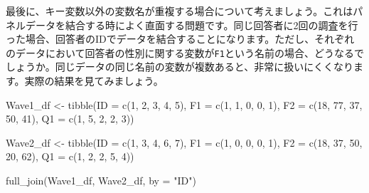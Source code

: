 \documentclass[
  a4paper,
  pandoc,
  ja=standard,
  jafont=haranoaji]{bxjsbook}
\newenvironment{Shaded}{\begin{snugshade}}{\end{snugshade}}
\newcommand{\AttributeTok}[1]{\textcolor[rgb]{0.00,0.48,0.65}{#1}}
\newcommand{\DecValTok}[1]{\textcolor[rgb]{0.68,0.00,0.00}{#1}}
\newcommand{\FunctionTok}[1]{\textcolor[rgb]{0.28,0.35,0.67}{#1}}
\newcommand{\NormalTok}[1]{\textcolor[rgb]{0.00,0.48,0.65}{#1}}
\newcommand{\OtherTok}[1]{\textcolor[rgb]{0.00,0.48,0.65}{#1}}
\newcommand{\StringTok}[1]{\textcolor[rgb]{0.13,0.47,0.30}{#1}}
\begin{document}
最後に、キー変数以外の変数名が重複する場合について考えましょう。これはパネルデータを結合する時によく直面する問題です。同じ回答者に2回の調査を行った場合、回答者のIDでデータを結合することになります。ただし、それぞれのデータにおいて回答者の性別に関する変数が\texttt{F1}という名前の場合、どうなるでしょうか。同じデータの同じ名前の変数が複数あると、非常に扱いにくくなります。実際の結果を見てみましょう。

\begin{Shaded}
\begin{Highlighting}[numbers=left,,]
\NormalTok{Wave1\_df }\OtherTok{\textless{}{-}} \FunctionTok{tibble}\NormalTok{(}\AttributeTok{ID =} \FunctionTok{c}\NormalTok{(}\DecValTok{1}\NormalTok{, }\DecValTok{2}\NormalTok{, }\DecValTok{3}\NormalTok{, }\DecValTok{4}\NormalTok{, }\DecValTok{5}\NormalTok{),}
                   \AttributeTok{F1 =} \FunctionTok{c}\NormalTok{(}\DecValTok{1}\NormalTok{, }\DecValTok{1}\NormalTok{, }\DecValTok{0}\NormalTok{, }\DecValTok{0}\NormalTok{, }\DecValTok{1}\NormalTok{),}
                   \AttributeTok{F2 =} \FunctionTok{c}\NormalTok{(}\DecValTok{18}\NormalTok{, }\DecValTok{77}\NormalTok{, }\DecValTok{37}\NormalTok{, }\DecValTok{50}\NormalTok{, }\DecValTok{41}\NormalTok{),}
                   \AttributeTok{Q1 =} \FunctionTok{c}\NormalTok{(}\DecValTok{1}\NormalTok{, }\DecValTok{5}\NormalTok{, }\DecValTok{2}\NormalTok{, }\DecValTok{2}\NormalTok{, }\DecValTok{3}\NormalTok{))}

\NormalTok{Wave2\_df }\OtherTok{\textless{}{-}} \FunctionTok{tibble}\NormalTok{(}\AttributeTok{ID =} \FunctionTok{c}\NormalTok{(}\DecValTok{1}\NormalTok{, }\DecValTok{3}\NormalTok{, }\DecValTok{4}\NormalTok{, }\DecValTok{6}\NormalTok{, }\DecValTok{7}\NormalTok{),}
                   \AttributeTok{F1 =} \FunctionTok{c}\NormalTok{(}\DecValTok{1}\NormalTok{, }\DecValTok{0}\NormalTok{, }\DecValTok{0}\NormalTok{, }\DecValTok{0}\NormalTok{, }\DecValTok{1}\NormalTok{),}
                   \AttributeTok{F2 =} \FunctionTok{c}\NormalTok{(}\DecValTok{18}\NormalTok{, }\DecValTok{37}\NormalTok{, }\DecValTok{50}\NormalTok{, }\DecValTok{20}\NormalTok{, }\DecValTok{62}\NormalTok{),}
                   \AttributeTok{Q1 =} \FunctionTok{c}\NormalTok{(}\DecValTok{1}\NormalTok{, }\DecValTok{2}\NormalTok{, }\DecValTok{2}\NormalTok{, }\DecValTok{5}\NormalTok{, }\DecValTok{4}\NormalTok{))}

\FunctionTok{full\_join}\NormalTok{(Wave1\_df, Wave2\_df, }\AttributeTok{by =} \StringTok{"ID"}\NormalTok{)}
\end{Highlighting}
\end{Shaded}
\end{document}
